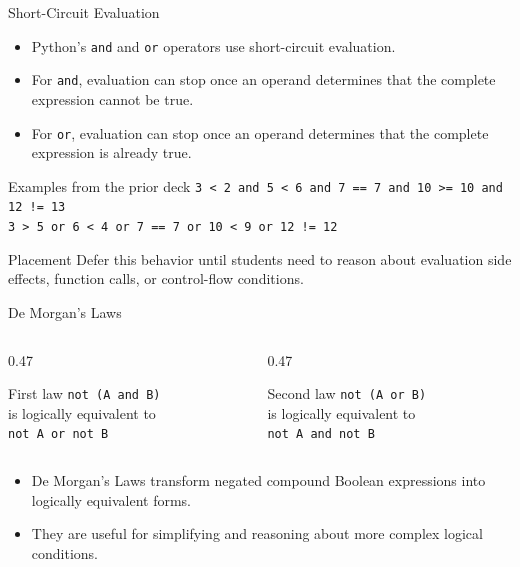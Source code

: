 \documentclass[aspectratio=169,10pt]{beamer}
\begin{document}
\begin{frame}{Short-Circuit Evaluation}
  \begin{itemize}
    \item Python's \texttt{and} and \texttt{or} operators use short-circuit evaluation.
    \item For \texttt{and}, evaluation can stop once an operand determines that the complete expression cannot be true.
    \item For \texttt{or}, evaluation can stop once an operand determines that the complete expression is already true.
  \end{itemize}

  \begin{block}{Examples from the prior deck}
    \texttt{3 < 2 and 5 < 6 and 7 == 7 and 10 >= 10 and 12 != 13}\\[0.10in]
    \texttt{3 > 5 or 6 < 4 or 7 == 7 or 10 < 9 or 12 != 12}
  \end{block}

  \begin{alertblock}{Placement}
    Defer this behavior until students need to reason about evaluation side effects, function calls, or control-flow conditions.
  \end{alertblock}
\end{frame}

\begin{frame}{De Morgan's Laws}
  \begin{columns}[T,onlytextwidth]
    \begin{column}{0.47\textwidth}
      \begin{block}{First law}
        \texttt{not (A and B)}\\[0.08in]
        is logically equivalent to\\[0.08in]
        \texttt{not A or not B}
      \end{block}
    \end{column}

    \begin{column}{0.47\textwidth}
      \begin{block}{Second law}
        \texttt{not (A or B)}\\[0.08in]
        is logically equivalent to\\[0.08in]
        \texttt{not A and not B}
      \end{block}
    \end{column}
  \end{columns}

  \begin{itemize}
    \item De Morgan's Laws transform negated compound Boolean expressions into logically equivalent forms.
    \item They are useful for simplifying and reasoning about more complex logical conditions.
  \end{itemize}
\end{frame}
\end{document}
